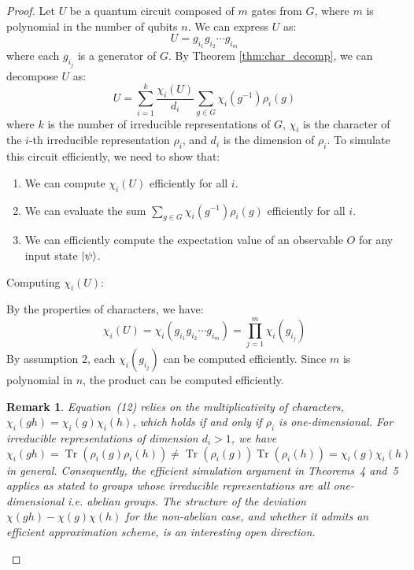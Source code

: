 \documentclass[10pt,a4paper]{amsart}
\newtheorem{remark}{Remark}
\DeclareMathOperator{\Tr}{Tr}
\begin{document}
\begin{proof}
Let $U$ be a quantum circuit composed of $m$ gates from $G$, where $m$ is polynomial in the number of qubits $n$. We can express $U$ as:
\begin{equation}
U = g_{i_1} g_{i_2} \cdots g_{i_m}
\end{equation}
where each $g_{i_j}$ is a generator of $G$. By Theorem \ref{thm:char_decomp}, we can decompose $U$ as:
\begin{equation}
U = \sum_{i=1}^k \frac{\chi_i(U)}{d_i} \sum_{g \in G} \chi_i(g^{-1}) \rho_i(g)
\end{equation}
where $k$ is the number of irreducible representations of $G$, $\chi_i$ is the character of the $i$-th irreducible representation $\rho_i$, and $d_i$ is the dimension of $\rho_i$.
To simulate this circuit efficiently, we need to show that:
\begin{enumerate}
\item We can compute $\chi_i(U)$ efficiently for all $i$.
\item We can evaluate the sum $\sum_{g \in G} \chi_i(g^{-1}) \rho_i(g)$ efficiently for all $i$.
\item We can efficiently compute the expectation value of an observable $O$ for any input state $\ket{\psi}$.
\end{enumerate}

\noindent

Computing $\chi_i(U)$:

By the properties of characters, we have:
\begin{equation}
\chi_i(U) = \chi_i(g_{i_1} g_{i_2} \cdots g_{i_m}) = \prod_{j=1}^m \chi_i(g_{i_j})
\end{equation}
By assumption 2, each $\chi_i(g_{i_j})$ can be computed efficiently. Since $m$ is polynomial in $n$, the product can be computed efficiently.

\begin{remark}
\label{rmk:char_mult}
Equation~(12) relies on the multiplicativity of characters, 
$\chi_i(gh) = \chi_i(g)\chi_i(h)$, which holds if and only if 
$\rho_i$ is one-dimensional. For irreducible representations of 
dimension $d_i > 1$, we have \[\chi_i(gh) = \Tr(\rho_i(g)\rho_i(h)) 
\neq \Tr(\rho_i(g))\Tr(\rho_i(h)) = \chi_i(g)\chi_i(h)\] in general. 
Consequently, the efficient simulation argument in Theorems~4 and~5 
applies as stated to groups whose irreducible representations are all 
one-dimensional i.e. abelian groups. The structure of the 
deviation $\chi(gh) - \chi(g)\chi(h)$ for the non-abelian case, and 
whether it admits an efficient approximation scheme, is an interesting 
open direction.
\end{remark}


\end{proof}
\end{document}

